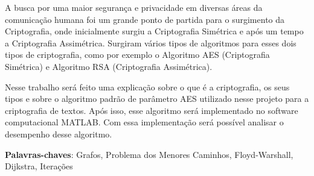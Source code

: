 

\setlength{\absparsep}{18pt} %
	\begin{resumo}
	A busca por uma maior segurança e privacidade em diversas áreas da comunicação humana
foi um grande ponto de partida para o surgimento da Criptografia, onde inicialmente surgiu a Criptografia Simétrica e após um tempo
a Criptografia Assimétrica. Surgiram vários tipos de algoritmos para esses dois tipos de criptografia, como por exemplo o Algoritmo AES (Criptografia Simétrica)  e Algoritmo RSA (Criptografia Assimétrica).


Nesse trabalho será feito uma explicação sobre o que é a criptografia, os seus tipos e sobre o algoritmo padrão de parâmetro AES
utilizado nesse projeto para a criptografia de textos. Após isso, esse algoritmo será implementado no software
computacional MATLAB. Com essa implementação será possível analisar o desempenho desse algoritmo.
	
		\noindent
		\textbf{Palavras-chaves}: Grafos, Problema dos Menores Caminhos, Floyd-Warshall, Dijkstra, Iterações
	\end{resumo}
